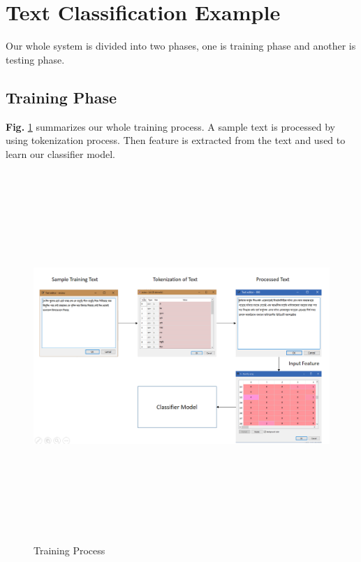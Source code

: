 \documentclass[12pt,a4paper]{report}
\begin{document}
\section{Text Classification Example}
Our whole system is divided into two phases, one is training phase and another is testing phase.
\subsection{Training Phase}
\textbf{Fig.} \ref{fig:TP} summarizes our whole training process. A sample text is processed by using tokenization process. Then feature is extracted from the text and used to learn our classifier model.
\vspace{1cm}
\begin{figure}[h!]
    \centering
    \includegraphics[width=15cm,height=14cm]{Figures/training_phase.PNG}
    \caption{Training Process}
    \label{fig:TP}
\end{figure}
\clearpage
\end{document}
